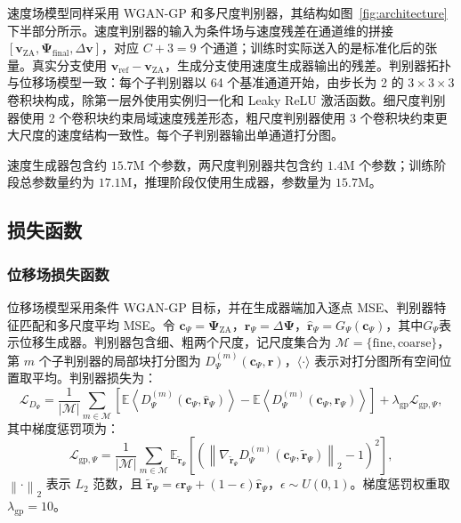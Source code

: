 速度场模型同样采用 WGAN-GP 和多尺度判别器，其结构如图~\ref{fig:architecture} 下半部分所示。速度判别器的输入为条件场与速度残差在通道维的拼接 $[\boldsymbol{v}_{\mathrm{ZA}}, \boldsymbol{\Psi}_{\mathrm{final}}, \Delta\boldsymbol{v}]$，对应 $C+3=9$ 个通道；训练时实际送入的是标准化后的张量。真实分支使用 $\boldsymbol{v}_{\mathrm{ref}}-\boldsymbol{v}_{\mathrm{ZA}}$，生成分支使用速度生成器输出的残差。判别器拓扑与位移场模型一致：每个子判别器以 64 个基准通道开始，由步长为 2 的 $3\times3\times3$ 卷积块构成，除第一层外使用实例归一化和 Leaky ReLU 激活函数。细尺度判别器使用 2 个卷积块约束局域速度残差形态，粗尺度判别器使用 3 个卷积块约束更大尺度的速度结构一致性。每个子判别器输出单通道打分图。

速度生成器包含约 $15.7\mathrm{M}$ 个参数，两尺度判别器共包含约 $1.4\mathrm{M}$ 个参数；训练阶段总参数量约为 $17.1\mathrm{M}$，推理阶段仅使用生成器，参数量为 $15.7\mathrm{M}$。

\subsection{损失函数}

\subsubsection{位移场损失函数}

位移场模型采用条件 WGAN-GP 目标，并在生成器端加入逐点 MSE、判别器特征匹配和多尺度平均 MSE。令 $\boldsymbol{c}_{\Psi}=\boldsymbol{\Psi}_{\mathrm{ZA}}$，$\boldsymbol{r}_{\Psi}=\Delta\boldsymbol{\Psi}$，$\hat{\boldsymbol{r}}_{\Psi}=G_{\Psi}(\boldsymbol{c}_{\Psi})$，其中$G_{\Psi}$表示位移生成器。判别器包含细、粗两个尺度，记尺度集合为 $\mathcal{M}=\{\mathrm{fine},\mathrm{coarse}\}$，第 $m$ 个子判别器的局部块打分图为 $D_{\Psi}^{(m)}(\boldsymbol{c}_{\Psi},\boldsymbol{r})$，$\langle\cdot\rangle$ 表示对打分图所有空间位置取平均。判别器损失为：
\begin{equation}
  \mathcal{L}_{D_{\Psi}} = \frac{1}{|\mathcal{M}|} \sum_{m\in\mathcal{M}} \left[ \mathbb{E}\left\langle D_{\Psi}^{(m)}(\boldsymbol{c}_{\Psi},\hat{\boldsymbol{r}}_{\Psi})\right\rangle - \mathbb{E}\left\langle D_{\Psi}^{(m)}(\boldsymbol{c}_{\Psi},\boldsymbol{r}_{\Psi})\right\rangle \right] + \lambda_{\mathrm{gp}}\mathcal{L}_{\mathrm{gp},\Psi},
\end{equation}
其中梯度惩罚项为：
\begin{equation}
  \mathcal{L}_{\mathrm{gp},\Psi} = \frac{1}{|\mathcal{M}|} \sum_{m\in\mathcal{M}} \mathbb{E}_{\tilde{\boldsymbol{r}}_{\Psi}} \left[ \left( \left\| \nabla_{\tilde{\boldsymbol{r}}_{\Psi}} D_{\Psi}^{(m)}(\boldsymbol{c}_{\Psi},\tilde{\boldsymbol{r}}_{\Psi}) \right\|_2 - 1 \right)^2 \right],
\end{equation}
\(\left\|\cdot\right\|_2\) 表示 $L_2$ 范数，且 $\tilde{\boldsymbol{r}}_{\Psi} = \epsilon\boldsymbol{r}_{\Psi} + (1-\epsilon)\hat{\boldsymbol{r}}_{\Psi}$，$\epsilon\sim U(0,1)$。梯度惩罚权重取 $\lambda_{\mathrm{gp}}=10$。

